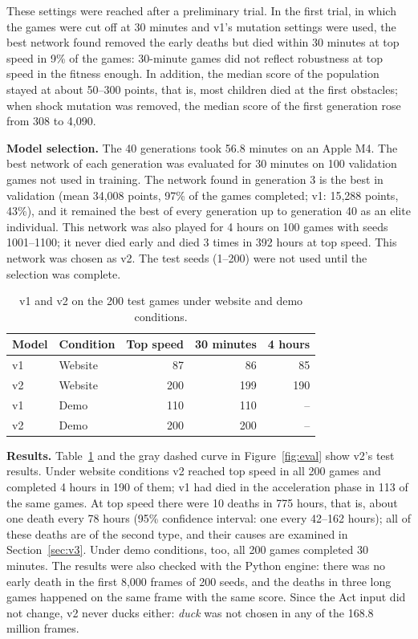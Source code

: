 \documentclass[11pt,a4paper]{article}
\begin{document}
These settings were reached after a preliminary trial. In the first trial, in which the games were cut off at 30 minutes and v1's mutation settings were used, the best network found removed the early deaths but died within 30 minutes at top speed in 9\% of the games: 30-minute games did not reflect robustness at top speed in the fitness enough. In addition, the median score of the population stayed at about 50--300 points, that is, most children died at the first obstacles; when shock mutation was removed, the median score of the first generation rose from 308 to 4,090.

\textbf{Model selection.} The 40 generations took 56.8 minutes on an Apple M4. The best network of each generation was evaluated for 30 minutes on 100 validation games not used in training. The network found in generation 3 is the best in validation (mean 34,008 points, 97\% of the games completed; v1: 15,288 points, 43\%), and it remained the best of every generation up to generation 40 as an elite individual. This network was also played for 4 hours on 100 games with seeds 1001--1100; it never died early and died 3 times in 392 hours at top speed. This network was chosen as v2. The test seeds (1--200) were not used until the selection was complete.

\begin{table}[!htbp]
  \centering
  \small
  \caption{v1 and v2 on the 200 test games under website and demo conditions.}
  \label{tab:v2}
  \begin{tabular}{@{}l l r r r@{}}
    \toprule
    Model & Condition & Top speed & 30 minutes & 4 hours \\
    \midrule
    v1 & Website & 87 & 86 & 85 \\
    v2 & Website & 200 & 199 & 190 \\
    v1 & Demo & 110 & 110 & -- \\
    v2 & Demo & 200 & 200 & -- \\
    \bottomrule
  \end{tabular}
\end{table}
\FloatBarrier

\textbf{Results.} Table~\ref{tab:v2} and the gray dashed curve in Figure~\ref{fig:eval} show v2's test results. Under website conditions v2 reached top speed in all 200 games and completed 4 hours in 190 of them; v1 had died in the acceleration phase in 113 of the same games. At top speed there were 10 deaths in 775 hours, that is, about one death every 78 hours (95\% confidence interval: one every 42--162 hours); all of these deaths are of the second type, and their causes are examined in Section~\ref{sec:v3}. Under demo conditions, too, all 200 games completed 30 minutes. The results were also checked with the Python engine: there was no early death in the first 8,000 frames of 200 seeds, and the deaths in three long games happened on the same frame with the same score. Since the Act input did not change, v2 never ducks either: \emph{duck} was not chosen in any of the 168.8 million frames.
\end{document}
